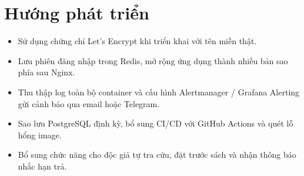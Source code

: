 \documentclass[../main.tex]{subfiles}
\begin{document}
\section*{Hướng phát triển}
\begin{itemize}
    \item Sử dụng chứng chỉ Let's Encrypt khi triển khai với tên miền thật.
    \item Lưu phiên đăng nhập trong Redis, mở rộng ứng dụng thành nhiều bản sao phía sau Nginx.
    \item Thu thập log toàn bộ container và cấu hình Alertmanager / Grafana Alerting gửi cảnh báo qua email hoặc Telegram.
    \item Sao lưu PostgreSQL định kỳ, bổ sung CI/CD với GitHub Actions và quét lỗ hổng image.
    \item Bổ sung chức năng cho độc giả tự tra cứu, đặt trước sách và nhận thông báo nhắc hạn trả.
\end{itemize}
\end{document}
